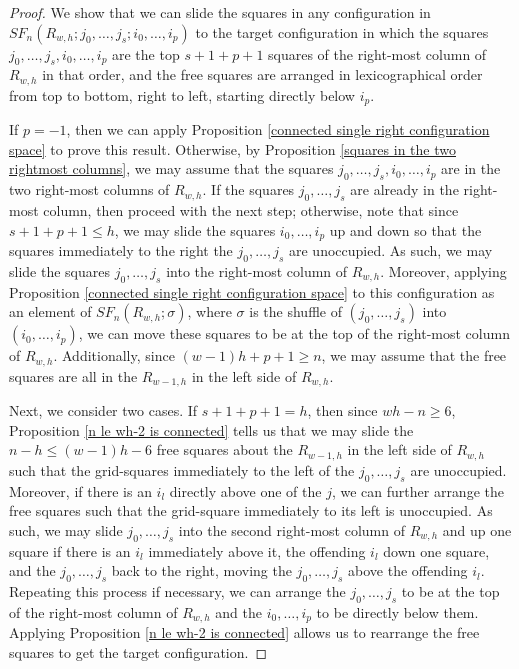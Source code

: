 \documentclass[10pt,a4paper]{amsart}
\begin{document}
\begin{proof}

We show that we can slide the squares in any configuration in $SF_{n}(R_{w,h}; j_{0}, \dots, j_{s};i_{0}, \dots, i_{p})$ to the target configuration in which the squares $j_{0}, \dots, j_{s}, i_{0},\dots, i_{p}$ are the top $s+1+p+1$ squares of the right-most column of $R_{w,h}$ in that order, and the free squares are arranged in lexicographical order from top to bottom, right to left, starting directly below $i_{p}$.

If $p=-1$, then we can apply Proposition \ref{connected single right configuration space} to prove this result.
Otherwise, by Proposition \ref{squares in the two rightmost columns}, we may assume that the squares $j_{0}, \dots, j_{s},i_{0}, \dots, i_{p}$ are in the two right-most columns of $R_{w,h}$.
If the squares $j_{0}, \dots, j_{s}$ are already in the right-most column, then proceed with the next step; otherwise, note that since $s+1+p+1\le h$, we may slide the squares $i_{0}, \dots, i_{p}$ up and down so that the squares immediately to the right the $j_{0}, \dots, j_{s}$ are unoccupied. 
As such, we may slide the squares $j_{0}, \dots, j_{s}$ into the right-most column of $R_{w,h}$.
Moreover, applying Proposition \ref{connected single right configuration space} to this configuration as an element of $SF_{n}(R_{w,h};\sigma)$, where $\sigma$ is the shuffle of $(j_{0},\dots, j_{s})$ into $(i_{0},\dots, i_{p})$, we can move these squares to be at the top of the right-most column of $R_{w,h}$.
Additionally, since $(w-1)h+p+1\ge n$, we may assume that the free squares are all in the $R_{w-1,h}$ in the left side of $R_{w,h}$.

Next, we consider two cases.
If $s+1+p+1=h$, then since $wh-n\ge 6$, Proposition \ref{n le wh-2 is connected} tells us that we may slide the $n-h\le(w-1)h-6$ free squares about the $R_{w-1,h}$ in the left side of $R_{w,h}$ such that the grid-squares immediately to the left of the $j_{0},\dots, j_{s}$ are unoccupied. 
Moreover, if there is an $i_{l}$ directly above one of the $j$, we can further arrange the free squares such that the grid-square immediately to its left is unoccupied.
As such, we may slide $j_{0}, \dots, j_{s}$ into the second right-most column of $R_{w,h}$ and up one square if there is an $i_{l}$ immediately above it, the offending $i_{l}$ down one square, and the $j_{0},\dots, j_{s}$ back to the right, moving the $j_{0},\dots, j_{s}$ above the offending $i_{l}$.
Repeating this process if necessary, we can arrange the $j_{0}, \dots, j_{s}$ to be at the top of the right-most column of $R_{w,h}$ and the $i_{0},\dots, i_{p}$ to be directly below them.
Applying Proposition \ref{n le wh-2 is connected} allows us to rearrange the free squares to get the target configuration.


\end{proof}
\end{document}
